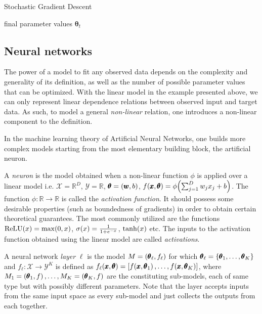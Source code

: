 \begin{algorithm}
\caption{Stochastic Gradient Descent}
\label{algorithm:sgd}
\begin{algorithmic}
\ENDWHILE
\RETURN final parameter values $\pmb{\theta}_{t}$
\end{algorithmic}
\end{algorithm} 


\subsection{Neural networks}
The power of a model to fit any observed data depends on the complexity and generality of its definition, as well as the number of possible parameter values that can be optimized. With the linear model in the example presented above, we can only represent linear dependence relations between observed input and target data. As such, to model a general \emph{non-linear} relation, one introduces a non-linear component to the definition.

In the machine learning theory of Artificial Neural Networks, one builds more complex models starting from the most elementary building block, the artificial neuron.
\begin{definition}
A \emph{neuron} is the model obtained when a non-linear function $\phi$ is applied over a linear model i.e. $\mathcal{X} = \mathbb{R}^D$, $\mathcal{Y}=\mathbb{R}$, $\pmb{\theta} = \mathopen{}\left(\pmb{w}, b\right)$, $f\mathopen{}\left(\pmb{x}, \pmb{\theta}\right) = \phi\mathopen{}\left(\sum_{j=1}^{D}{w_j x_j} + b\right)$. The function $\phi: \mathbb{R} \to \mathbb{R}$ is called the \emph{activation function}. It should possess some desirable properties (such as boundedness of gradients) in order to obtain certain theoretical guarantees. The most commonly utilized are the functions $\text{ReLU}\mathopen{}\left(x\right)=\max\mathopen{}\left(0,x\right)$, $\sigma\mathopen{}\left(x\right)=\frac{1}{1+e^{-x}}$, $\tanh\mathopen{}\left(x\right)$ etc. The inputs to the activation function obtained using the linear model are called \emph{activations}.
\end{definition}

\begin{definition}
A neural network \emph{layer} $\ell$ is the model $M = \mathopen{}\left(\pmb{\theta}_{\ell}, f_{\ell}\right)$ for which $\pmb{\theta}_{\ell} = \mathopen{}\left\{\pmb{\theta}_1, \dots, \pmb{\theta}_K\right\}$ and $f_{\ell}: \mathcal{X} \to \mathcal{Y}^K$ is defined as $f_{\ell}\mathopen{}\left(\pmb{x}, \pmb{\theta}\right) = \mathopen{}\left[f\mathopen{}\left(\pmb{x}, \pmb{\theta}_1\right),\dots,f\mathopen{}\left(\pmb{x}, \pmb{\theta}_K\right)\right]$, where $M_1=\mathopen{}\left(\pmb{\theta}_1, f\right),\dots,M_K=\mathopen{}\left(\pmb{\theta}_K, f\right)$ are the constituting sub-models, each of same type but with possibly different parameters. Note that the layer accepts inputs from the same input space as every sub-model and just collects the outputs from each together.
\end{definition}

